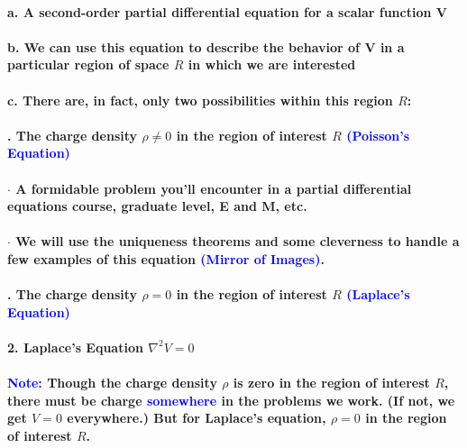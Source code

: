 \documentclass{article}
\begin{document}
\paragraph{\indent a. A second-order partial differential equation for a scalar function V}
\paragraph{\indent b. We can use this equation to describe the behavior of V in a particular region of space $R$ in which we are interested}
\paragraph{\indent c. There are, in fact, only two possibilities within this region $R$:}
\paragraph{\indent{}. The charge density $\rho\neq 0$ in the region of interest $R$ \textcolor{blue}{(Poisson's Equation)}}
\paragraph{\indent\indent $\cdot$ A formidable problem you'll encounter in a partial differential equations course, graduate level, E and M, etc.}
\paragraph{\indent\indent $\cdot$ We will use the uniqueness theorems and  some cleverness to handle a few examples of this equation \textcolor{blue}{(Mirror of Images)}.}
\paragraph{\indent{}. The charge density $\rho=0$ in the region of interest $R$ \textcolor{blue}{(Laplace's Equation)}}
\paragraph{2. Laplace's Equation $\nabla^2V=0$}
\paragraph{\indent \textcolor{blue}{Note:} Though the charge density $\rho$ is zero in the region of interest $R$, there must be charge \textcolor{blue}{somewhere} in the problems we work. (If not, we get $V=0$ everywhere.) But for Laplace's equation, $\rho=0$ in the region of interest $R$.}
\end{document}

